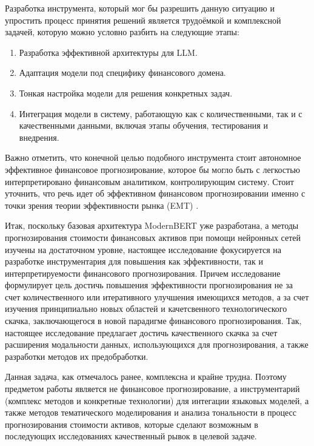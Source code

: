 Разработка инструмента, который мог бы разрешить данную ситуацию и упростить процесс принятия решений является трудоёмкой
и комплексной задачей, которую можно условно разбить на следующие этапы:

\begin{enumerate}
    \item Разработка эффективной архитектуры для LLM.
    \item Адаптация модели под специфику финансового домена.
    \item Тонкая настройка модели для решения конкретных задач.
    \item Интеграция модели в систему, работающую как с количественными, так и с качественными данными,
    включая этапы обучения, тестирования и внедрения.
\end{enumerate}

Важно отметить, что конечной целью подобного инструмента стоит автономное эффективное финансовое прогнозирование, которое
бы могло быть с легкостью интерпретировано финансовым аналитиком, контролирующим систему. Стоит уточнить, что речь
идет об эффективном финансовом прогнозировании именно с точки зрения теории эффективности рынка (EMT) \parencite{emt1970fama}.

Итак, поскольку базовая архитектура ModernBERT уже разработана, а методы прогнозирования стоимости финансовых активов при помощи нейронных
сетей изучены на достаточном уровне, настоящее исследование фокусируется на разработке инструментария для повышения как эффективности, так и
интерпретируемости финансового прогнозирования. Причем исследование формулирует цель достичь повышения эффективности прогнозирования
не за счет количественного или итеративного улучшения имеющихся методов, а за счет изучения принципиально новых областей и качетсвенного
технологического скачка, заключающегося в новой парадигме финансового прогнозирования. Так, настоящее исследование предлагает
достичь качественного скачка за счет расширения модальности данных, использующихся для прогнозирования, а также
разработки методов их предобработки.

Данная задача, как отмечалось ранее, комплексна и крайне трудна. Поэтому предметом работы является не финансовое прогнозирование,
а инструментарий (комплекс методов и конкретные технологии) для интегации языковых моделей, а также методов тематического
моделирования и анализа тональности в процесс прогнозирования стоимости активов, которые сделают возможным в последующих
исследованиях качественный рывок в целевой задаче.


